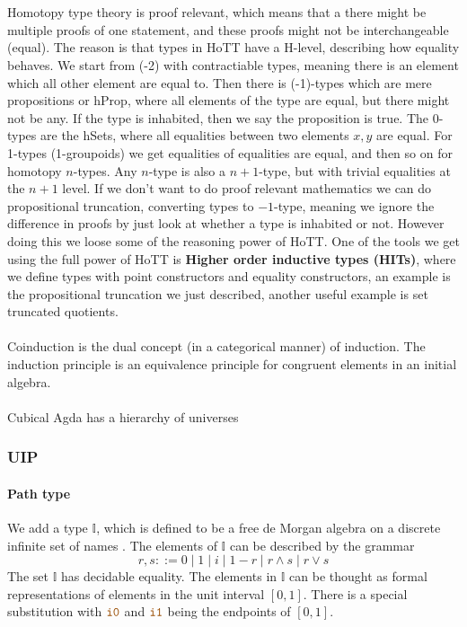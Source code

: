 \documentclass[twoside,11pt,openright]{report}
\theoremstyle{plain} %
\theoremstyle{definition}
\theoremstyle{remark}
\newcommand*{\constant}[1]{\textcolor{orange!60!black}{\ensuremath{\mathtt{#1}}}}
\begin{document}
\\ \\
Homotopy type theory is proof relevant, which means that a there might be multiple proofs of one statement, and these proofs might not be interchangeable (equal). The reason is that types in HoTT have a H-level, describing how equality behaves. We start from (-2) with contractiable types, meaning there is an element which all other element are equal to. Then there is (-1)-types which are mere propositions or hProp, where all elements of the type are equal, but there might not be any. If the type is inhabited, then we say the proposition is true. The 0-types are the hSets, where all equalities between two elements \(x,y\) are equal. For 1-types (1-groupoids) we get equalities of equalities are equal, and then so on for homotopy \(n\)-types. Any \(n\)-type is also a \(n+1\)-type, but with trivial equalities at the \(n+1\) level. If we don't want to do proof relevant mathematics we can do propositional truncation, converting types to \(-1\)-type, meaning we ignore the difference in proofs by just look at whether a type is inhabited or not. However doing this we loose some of the reasoning power of HoTT. One of the tools we get using the full power of HoTT is \textbf{Higher order inductive types (HITs)}, where we define types with point constructors and equality constructors, an example is the propositional truncation we just described, another useful example is set truncated quotients.
\\ \\
Coinduction is the dual concept (in a categorical manner) of induction. The induction principle is an equivalence principle for congruent elements in an initial algebra.
\\ \\
Cubical Agda has a hierarchy of universes

\subsubsection{UIP}
\paragraph{Path type}
We add a type \(\mathbb{I}\), which is defined to be a free de Morgan algebra on a discrete infinite set of names . The elements of \(\mathbb{I}\) can be described by the grammar
\begin{equation}
  r,s ::= 0 \mid 1 \mid i \mid 1 - r \mid r \land s \mid r \lor s
\end{equation}
The set \(\mathbb{I}\) has decidable equality. The elements in \(\mathbb{I}\) can be thought as formal representations of elements in the unit interval \([0,1]\). There is a special substitution with \(\constant{i0}\) and \(\constant{i1}\) being the endpoints of \([0,1]\).
\end{document}
